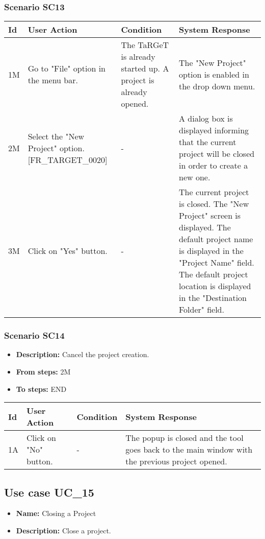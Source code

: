 \documentclass[a4paper,11pt]{article}
\newcommand{\bl}{\\ \hline}
\begin{document}
\subsubsection*{Scenario SC13}
\begin{tabular}{|p{0.4in}|p{1.5in}|p{1.5in}|p{1.5in}|}
\hline
Id & User Action & Condition & System Response \bl 
1M & Go to "File" option in the menu bar.  & The TaRGeT is already started up. A project is already
						opened. & The "New Project" option is enabled in the drop down
						menu. \bl
2M & Select the "New Project" option. [FR_TARGET_0020]  & - & A dialog box is displayed informing that the current
						project will be closed in order to create a new one. \bl
3M & Click on "Yes" button. & - & The current project is closed. The "New Project" screen
						is displayed. The default project name is displayed in the
						"Project Name" field. The default project location is displayed in
						the "Destination Folder" field. \bl
\end{tabular}
\subsubsection*{Scenario SC14}
\begin{itemize}
\item {\bf Description:} Cancel the project creation.
\item {\bf From steps:} 2M
\item {\bf To steps:} END
\end{itemize}
\begin{tabular}{|p{0.4in}|p{1.5in}|p{1.5in}|p{1.5in}|}
\hline
Id & User Action & Condition & System Response \bl 
1A & Click on "No" button. & - & The popup is closed and the tool goes back to the main
						window with the previous project opened.\bl
\end{tabular}
\subsection*{Use case UC_15}
\begin{itemize}
\item {\bf Name: }Closing a Project
\item {\bf Description: }Close a project.
\end{itemize}
\end{document}
